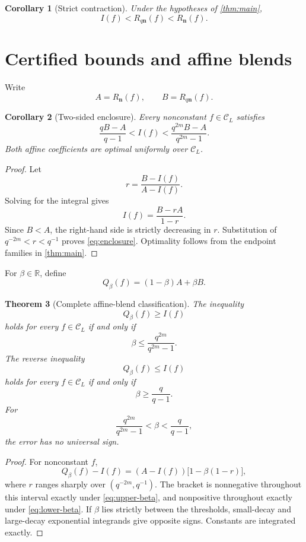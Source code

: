 \documentclass[11pt]{article}
\newtheorem{theorem}{Theorem}[section]
\newtheorem{corollary}[theorem]{Corollary}
\theoremstyle{definition}
\theoremstyle{remark}
\newcommand{\R}{\mathbb{R}}
\newcommand{\cC}{\mathcal{C}}
\newcommand{\bN}{\boldsymbol{n}}
\newcommand{\1}{\mathbf{1}}
\begin{document}
\begin{corollary}[Strict contraction]
\label{cor:contraction}
Under the hypotheses of \cref{thm:main},
\[
I(f)<R_{q\bN}(f)<R_{\bN}(f).
\]
\end{corollary}

\section{Certified bounds and affine blends}

Write
\[
A=R_{\bN}(f),
\qquad
B=R_{q\bN}(f).
\]

\begin{corollary}[Two-sided enclosure]
\label{cor:enclosure}
Every nonconstant \(f\in\cC_L\) satisfies
\begin{equation}
\boxed{
\frac{qB-A}{q-1}
<
I(f)
<
\frac{q^{2m}B-A}{q^{2m}-1}.}
\label{eq:enclosure}
\end{equation}
Both affine coefficients are optimal uniformly over \(\cC_L\).
\end{corollary}

\begin{proof}
Let
\[
r=\frac{B-I(f)}{A-I(f)}.
\]
Solving for the integral gives
\[
I(f)=\frac{B-rA}{1-r}.
\]
Since \(B<A\), the right-hand side is strictly decreasing in \(r\).
Substitution of \(q^{-2m}<r<q^{-1}\) proves
\eqref{eq:enclosure}. Optimality follows from the endpoint families in
\cref{thm:main}.
\end{proof}

For \(\beta\in\R\), define
\[
Q_\beta(f)=(1-\beta)A+\beta B.
\]

\begin{theorem}[Complete affine-blend classification]
\label{thm:blend}
The inequality
\[
Q_\beta(f)\ge I(f)
\]
holds for every \(f\in\cC_L\) if and only if
\begin{equation}
\beta\le\frac{q^{2m}}{q^{2m}-1}.
\label{eq:upper-beta}
\end{equation}
The reverse inequality
\[
Q_\beta(f)\le I(f)
\]
holds for every \(f\in\cC_L\) if and only if
\begin{equation}
\beta\ge\frac{q}{q-1}.
\label{eq:lower-beta}
\end{equation}
For
\[
\frac{q^{2m}}{q^{2m}-1}
<
\beta
<
\frac{q}{q-1},
\]
the error has no universal sign.
\end{theorem}

\begin{proof}
For nonconstant \(f\),
\[
Q_\beta(f)-I(f)
=(A-I(f))\bigl[1-\beta(1-r)\bigr],
\]
where \(r\) ranges sharply over
\((q^{-2m},q^{-1})\). The bracket is nonnegative throughout this interval
exactly under \eqref{eq:upper-beta}, and nonpositive throughout exactly under
\eqref{eq:lower-beta}. If \(\beta\) lies strictly between the thresholds,
small-decay and large-decay exponential integrands give opposite signs.
Constants are integrated exactly.
\end{proof}
\end{document}
